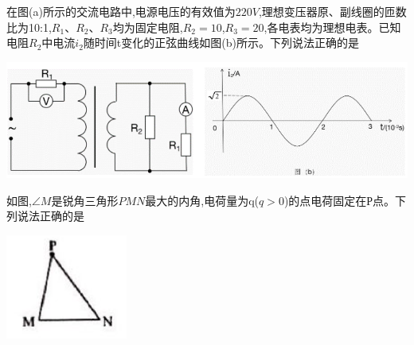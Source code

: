 \newpage
\question[6]在图(a)所示的交流电路中,电源电压的有效值为$220V$,理想变压器原、副线圈的匝数比为10:1,$R_1$、$R_2$、$R_3$均为固定电阻,$R_2=10$,$R_3=20$,各电表均为理想电表。已知电阻$R_2$中电流$i_2$随时间t变化的正弦曲线如图(b)所示。下列说法正确的是\begin{center}\includegraphics[width=14cm]{img/image5.png}\end{center}
\begin{solution}{4cm}

\end{solution}



\question[6]如图,$\angle M$是锐角三角形$PMN$最大的内角,电荷量为q($q>0$)的点电荷固定在Р点。下列说法正确的是\begin{center}\includegraphics[width=4cm]{img/image6.png}\end{center}
\begin{solution}{4cm}

\end{solution}


\newpage

